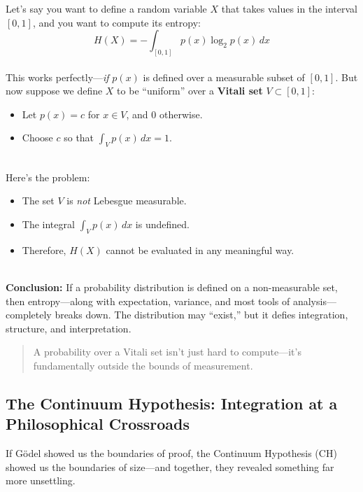 \begin{example}[title={When Entropy Breaks: A Distribution on a Vitali Set}]
Let’s say you want to define a random variable \( X \) that takes values in the interval \([0,1]\), and you want to compute its entropy:
\[
H(X) = -\int_{[0,1]} p(x) \log_2 p(x)\, dx
\]
\\
This works perfectly—\emph{if} \( p(x) \) is defined over a measurable subset of \([0,1]\). But now suppose we define \( X \) to be “uniform” over a \textbf{Vitali set} \( V \subset [0,1] \):
\begin{itemize}
  \item Let \( p(x) = c \) for \( x \in V \), and 0 otherwise.
  \item Choose \( c \) so that \( \int_V p(x)\, dx = 1 \).
\end{itemize}
\ \\
Here’s the problem:
\begin{itemize}
  \item The set \( V \) is \emph{not} Lebesgue measurable.
  \item The integral \( \int_V p(x)\, dx \) is undefined.
  \item Therefore, \( H(X) \) cannot be evaluated in any meaningful way.
\end{itemize}
\ \\
\textbf{Conclusion:} If a probability distribution is defined on a non-measurable set, then entropy—along with expectation, variance, and most tools of analysis—completely breaks down. The distribution may “exist,” but it defies integration, structure, and interpretation.
\ \\
\begin{quote}
A probability over a Vitali set isn’t just hard to compute—it’s fundamentally outside the bounds of measurement.
\end{quote}
\end{example}







\subsection{The Continuum Hypothesis: Integration at a Philosophical Crossroads}

If Gödel showed us the boundaries of proof, the Continuum Hypothesis (CH) showed us the boundaries of size—and together, they revealed something far more unsettling.

